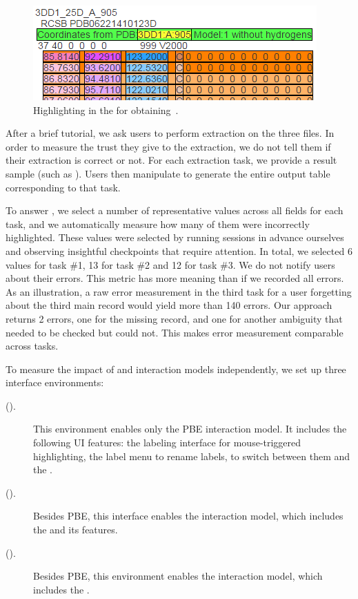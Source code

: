 \begin{figure}[t]
    \centering
    \includegraphics[width=0.7\columnwidth]{figures/hydrogenhybrid}
    \caption{Highlighting in the \InputTextView for obtaining~.}
    \label{fig:interactive:evaluation:highlighting}
\end{figure}

After a brief tutorial, we ask users to perform extraction on the three files.
In order to measure the trust they give to the extraction, we do not tell them if their extraction is correct or not.
For each extraction task, we provide a result sample (such as ).
Users then manipulate \FlashProg to generate the entire output table corresponding to that task.

To answer \RQOneShort, we select a number of representative values across all fields
for each task, and we automatically measure how many of them were incorrectly highlighted.
These values were selected by running \FlashProg sessions in advance
ourselves and observing insightful checkpoints that require attention.
In total, we selected 6 values for task \#1, 13 for task \#2 and 12 for task \#3.
We do not notify users about their errors.
This metric has more meaning than if we recorded all errors.
As an illustration, a raw error measurement in the third task for a user forgetting about the third main record would
yield more than 140 errors.
Our approach returns 2 errors, one for the missing record, and one for another ambiguity that needed to be checked but
could not.
This makes error measurement comparable across tasks.

To measure the impact of \ProgramNavigation and \ConversationalClarification interaction models
independently, we set up three interface environments:

\begin{description}
    \item[\BIdef (\BI).] This environment enables only the PBE interaction model.
        It includes the following UI features: the labeling interface for mouse-triggered highlighting, the
        label menu to rename labels, to switch between them and the \OutputTab.
    \item[\BIPWdef (\BIPW).] Besides PBE, this interface enables the
        \ProgramNavigation interaction model, which includes the \ProgramNavigationTab and its features.
    \item[\BIDTdef (\BIDT).] Besides PBE, this environment enables the
        \ConversationalClarification interaction model, which includes the \ConversationalClarificationTab.
\end{description}

